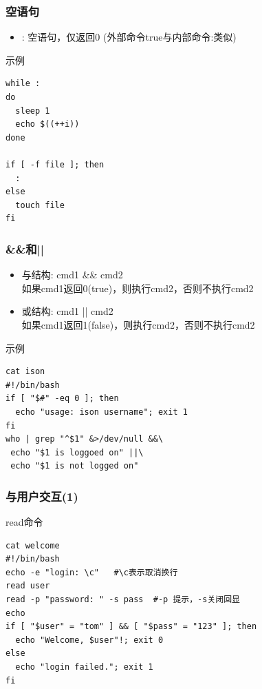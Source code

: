 \documentclass[xcolor=svgnames,presentation]{beamer}
\begin{document}
\begin{frame}[fragile]
\frametitle{空语句}
\label{sec-1-2-38}
\begin{itemize}

\item : 空语句，仅返回0 (外部命令true与内部命令:类似)
\label{sec-1-2-38-1}%
\end{itemize} %
\begin{exampleblock}{示例}
\label{sec-1-2-38-2}


\begin{verbatim}
while :
do
  sleep 1
  echo $((++i))
done

if [ -f file ]; then
  :
else
  touch file
fi
\end{verbatim}
\end{exampleblock}
\end{frame}
\begin{frame}[fragile]
\frametitle{\&\&和||}
\label{sec-1-2-39}
\begin{itemize}

\item 与结构: cmd1 \&\& cmd2\\
\label{sec-1-2-39-1}%
如果cmd1返回0(true)，则执行cmd2，否则不执行cmd2

\item 或结构: cmd1 || cmd2\\
\label{sec-1-2-39-2}%
如果cmd1返回1(false)，则执行cmd2，否则不执行cmd2
\end{itemize} %
\begin{exampleblock}{示例}
\label{sec-1-2-39-3}


\begin{verbatim}
cat ison
#!/bin/bash
if [ "$#" -eq 0 ]; then
  echo "usage: ison username"; exit 1
fi
who | grep "^$1" &>/dev/null &&\
 echo "$1 is loggoed on" ||\
 echo "$1 is not logged on"
\end{verbatim}
\end{exampleblock}
\end{frame}
\begin{frame}[fragile]
\frametitle{与用户交互(1)}
\label{sec-1-2-40}
\begin{exampleblock}{read命令}
\label{sec-1-2-40-1}


\begin{verbatim}
cat welcome
#!/bin/bash
echo -e "login: \c"   #\c表示取消换行
read user
read -p "password: " -s pass  #-p 提示，-s关闭回显
echo
if [ "$user" = "tom" ] && [ "$pass" = "123" ]; then 
  echo "Welcome, $user"!; exit 0
else
  echo "login failed."; exit 1
fi
\end{verbatim}
\end{exampleblock}
\end{frame}
\end{document}
